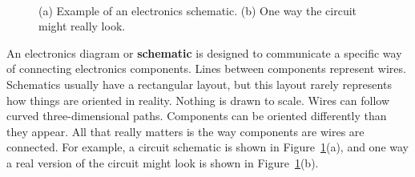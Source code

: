 \documentclass[11pt]{article}
\begin{document}
\begin{figure}[ht]
  \begin{center}
    \\
    \vspace{12 pt}
   \end{center}
  \caption{(a) Example of an electronics schematic. (b) One way 
    the circuit might really look.}
  \label{fig:schematic_example}
\end{figure}

An electronics diagram or \textbf{schematic} is designed to
communicate a specific way of connecting electronics components.
Lines between components represent wires. Schematics usually have a
rectangular layout, but this layout rarely represents how things are
oriented in reality. Nothing is drawn to scale. Wires can follow
curved three-dimensional paths. Components  can be oriented
differently than they appear. All that really matters is the way
components are wires are connected. For example, a circuit schematic is
shown in Figure~\ref{fig:schematic_example}(a), and one way a real
version of the circuit might look is shown in
Figure~\ref{fig:schematic_example}(b). 
\end{document}
